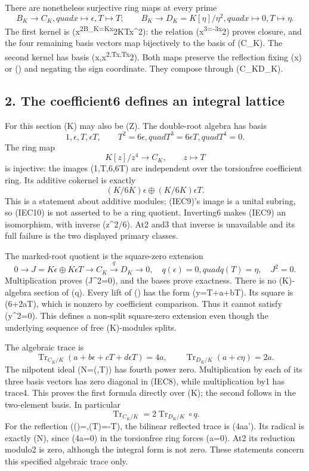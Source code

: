 \documentclass[
]{article}
\begin{document}
There are nonetheless surjective ring maps at every prime \[
B_K\longrightarrow C_K,quad x\mapsto\epsilon, T\mapsto T;
\qquad B_K\longrightarrow D_K=K[\eta]/\eta^2,quad x\mapsto0, T\mapsto\eta.
\tag{IEC7}
\] The first kernel is (x\textsuperscript{2B\_K=Kx}2\oplus KTx\^{}2):
the relation (x\textsuperscript{3=-3x}2) proves closure, and the four
remaining basis vectors map bijectively to the basis of (C\_K). The
second kernel has basis (x,x\textsuperscript{2,Tx,Tx}2). Both maps
preserve the reflection fixing (x) or (\epsilon) and negating the sign
coordinate. They compose through (C\_K\to D\_K).

\subsection{2. The coefficient6 defines an integral
lattice}\label{the-coefficient6-defines-an-integral-lattice}

For this section (K) may also be (\mathbb Z). The double-root algebra
has basis \[
1,\epsilon,T,\epsilon T,\qquad T^2=6\epsilon,quad T^3=6\epsilon T,quad T^4=0.
\tag{IEC8}
\] The ring map \[
K[z]/z^4\longrightarrow C_K,\qquad z\longmapsto T
\tag{IEC9}
\] is injective: the images (1,T,6\epsilon,6\epsilon T) are independent
over the torsionfree coefficient ring. Its additive cokernel is exactly
\[
(K/6K)\epsilon\oplus(K/6K)\epsilon T.
\tag{IEC10}
\] This is a statement about additive modules; (IEC9)'s image is a
unital subring, so (IEC10) is not asserted to be a ring quotient.
Inverting6 makes (IEC9) an isomorphism, with inverse
(\epsilon\mapsto z\^{}2/6). At2 and3 that inverse is unavailable and its
full failure is the two displayed primary classes.

The marked-root quotient is the square-zero extension \[
0\longrightarrow J=K\epsilon\oplus K\epsilon T
\longrightarrow C_K\xrightarrow{q}D_K\longrightarrow0,
\quad q(\epsilon)=0,quad q(T)=\eta,\quad J^2=0.
\tag{IEC11}
\] Multiplication proves (J\^{}2=0), and the bases prove exactness.
There is no (K)-algebra section of (q). Every lift of (\eta) has the
form (y=T+a\epsilon+b\epsilon T). Its square is
(6\epsilon+2a\epsilon T), which is nonzero by coefficient comparison.
Thus it cannot satisfy (y\^{}2=0). This defines a non-split square-zero
extension even though the underlying sequence of free (K)-modules
splits.

The algebraic trace is \[
\operatorname{Tr}_{C_K/K}(a+b\epsilon+cT+d\epsilon T)=4a,
\qquad\operatorname{Tr}_{D_K/K}(a+c\eta)=2a.
\tag{IEC12}
\] The nilpotent ideal (N=(\epsilon,T)) has fourth power zero.
Multiplication by each of its three basis vectors has zero diagonal in
(IEC8), while multiplication by1 has trace4. This proves the first
formula directly over (K); the second follows in the two-element basis.
In particular \[
\operatorname{Tr}_{C_K/K}=2\operatorname{Tr}_{D_K/K}\circ q.
\tag{IEC13}
\] For the reflection (\sigma(\epsilon)=\epsilon,\sigma(T)=-T), the
bilinear reflected trace is (4aa'). Its radical is exactly (N), since
(4a=0) in the torsionfree ring forces (a=0). At2 its reduction modulo2
is zero, although the integral form is not zero. These statements
concern this specified algebraic trace only.
\end{document}
